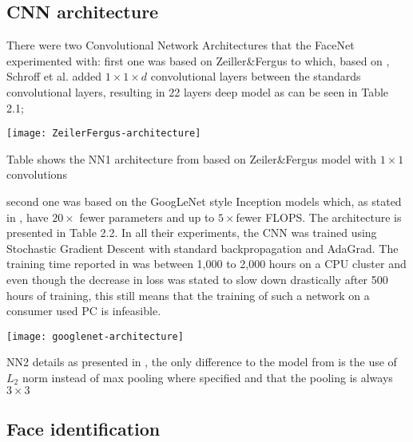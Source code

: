 \subsection{CNN architecture}
There were two Convolutional Network Architectures that the FaceNet experimented with: first one was based on Zeiller\&Fergus \cite{ZeilerF13} to which, based on \cite{LinCY13}, Schroff et al. added $1 \times 1 \times d$ convolutional layers between the standards convolutional layers, resulting in 22 layers deep model as can be seen in Table 2.1;
\begin{table}[h]
	\begin{center}
		\texttt{[image: ZeilerFergus-architecture]}
	\end{center}
	\caption[Zeiler\&Fergus architecture used in FaceNet]{Table shows the NN1 architecture from \cite{SchroffKP15} based on Zeiler\&Fergus model with $1 \times 1$ convolutions}
\end{table}
 second one was based on the GoogLeNet style Inception models \cite{DSzegedyLJSRAEVR14} which, as stated in \cite{SchroffKP15}, have $20\times$ fewer parameters and up to $5\times$fewer FLOPS. The architecture is presented in Table 2.2. In all their experiments, the CNN was trained using Stochastic Gradient Descent with standard backpropagation and AdaGrad. The training time reported in \cite{SchroffKP15} was between 1,000 to 2,000 hours on a CPU cluster and even though the decrease in loss was stated to slow down drastically after 500 hours of training, this still means that the training of such a network on a consumer used PC is infeasible. 
 \begin{table}[h]
 	\begin{center}
 		\texttt{[image: googlenet-architecture]}
 	\end{center}
 	\caption[NN2 Inception CNN architecture]{NN2 details as presented in \cite{SchroffKP15}, the only difference to the model from \cite{DSzegedyLJSRAEVR14} is the use of $L_2$ norm instead of max pooling where specified and that the pooling is always $3\times3$}
 \end{table}
\subsection{Face identification}

